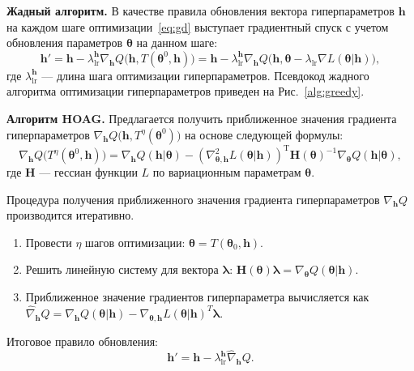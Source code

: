 \textbf{Жадный алгоритм. }
В качестве  правила обновления вектора гиперпараметров $\mathbf{h}$ на каждом шаге оптимизации~\eqref{eq:gd} выступает градиентный спуск с учетом обновления параметров $\boldsymbol{\theta}$ на данном шаге:
\begin{equation}
\label{eq:greed}
\mathbf{h}' =	 \mathbf{h} -  \lambda_{\text{lr}}^{\mathbf{h}} \nabla_{\mathbf{h}}  Q \bigl(\mathbf{h}, T(\boldsymbol{\theta}^{0}, \mathbf{h})\bigr) = \mathbf{h} -  \lambda_{\text{lr}}^{\mathbf{h}} \nabla_{\mathbf{h}}  Q\bigl(\mathbf{h}, \boldsymbol{\theta} -  \lambda_{\text{lr}} \nabla L(\boldsymbol{\theta}| \mathbf{h})\bigr),
\end{equation}
где $ \lambda_{\text{lr}}^{\mathbf{h}}$ --- длина шага оптимизации гиперпараметров.
Псевдокод жадного алгоритма оптимизации гиперпараметров приведен на Рис.~\ref{alg:greedy}.

\textbf{Алгоритм HOAG. }
Предлагается получить приближенное значения градиента гиперпараметров $\nabla_{\mathbf{h}} Q \bigl(\mathbf{h}, T^\eta(\boldsymbol{\theta}^0)\bigr)$ на основе следующей формулы:
\[
\nabla_{\mathbf{h}} Q \bigl(T^\eta(\boldsymbol{\theta}^0, \mathbf{h})\bigr) = \nabla_{\mathbf{h}} Q( \mathbf{h}| \boldsymbol{\theta}) - (\nabla^2_{\boldsymbol{\theta}, \mathbf{h}} L(\boldsymbol{\theta}| \mathbf{h}))^\text{T}\mathbf{H}(\boldsymbol{\theta})^{-1}\nabla_{\boldsymbol{\theta}} Q( \mathbf{h}| \boldsymbol{\theta}),
\]
где $\mathbf{H}$ --- гессиан функции $L$ по вариационным параметрам $\boldsymbol{\theta}$.

Процедура получения приближенного значения градиента гиперпараметров $\nabla_{\mathbf{h}} Q$  производится итеративно.
\begin{enumerate}
\item Провести $\eta$ шагов оптимизации: $\boldsymbol{\theta} = T(\boldsymbol{\theta}_0, \mathbf{h})$.
\item Решить линейную систему для вектора $\boldsymbol{\lambda}$: $\mathbf{H}(\boldsymbol{\theta})\boldsymbol{\lambda} =  \nabla_{\boldsymbol{\theta}} Q(\boldsymbol{\theta}| \mathbf{h})$.
\item Приближенное значение градиентов гиперпараметра вычисляется как $\hat{\nabla}_{\mathbf{h}}Q = \nabla_{\mathbf{h}}Q(\boldsymbol{\theta}| \mathbf{h}) -\nabla_{\boldsymbol{\theta}, \mathbf{h}} L(\boldsymbol{\theta}| \mathbf{h})^T\boldsymbol{\lambda}$.
\end{enumerate}

Итоговое правило обновления:
\begin{equation}
\label{eq:update_hyper}
\mathbf{h}' = \mathbf{h} -  \lambda_{\text{lr}}^{\mathbf{h}} \hat{\nabla}_{\mathbf{h}}Q.
\end{equation}

